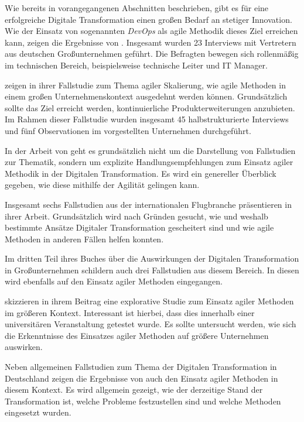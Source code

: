 Wie bereits in vorangegangenen Abschnitten beschrieben, gibt es für eine erfolgreiche Digitale Transformation einen großen Bedarf an stetiger Innovation. Wie der Einsatz von sogenannten \textit{DevOps} als agile Methodik dieses Ziel erreichen kann, zeigen die Ergebnisse von . Insgesamt wurden 23 Interviews mit Vertretern aus deutschen Großunternehmen geführt. Die Befragten bewegen sich rollenmäßig im technischen Bereich, beispielsweise technische Leiter und IT Manager.

 zeigen in ihrer Fallstudie zum Thema agiler Skalierung, wie agile Methoden in einem großen Unternehmenskontext ausgedehnt werden können. Grundsätzlich sollte das Ziel erreicht werden, kontinuierliche Produkterweiterungen anzubieten. Im Rahmen dieser Fallstudie wurden insgesamt 45 halbstrukturierte Interviews  und fünf Observationen im vorgestellten Unternehmen durchgeführt.

In der Arbeit von  geht es grundsätzlich nicht um die Darstellung von Fallstudien zur Thematik, sondern um explizite Handlungsempfehlungen zum Einsatz agiler Methodik in der Digitalen Transformation. Es wird ein genereller Überblick gegeben, wie diese mithilfe der Agilität gelingen kann.

Insgesamt sechs Fallstudien aus der internationalen Flugbranche präsentieren  in ihrer Arbeit. Grundsätzlich wird nach Gründen gesucht, wie und weshalb bestimmte Ansätze Digitaler Transformation gescheitert sind und wie agile Methoden in anderen Fällen helfen konnten.

Im dritten Teil ihres Buches über die Auswirkungen der Digitalen Transformation in Großunternehmen schildern  auch drei Fallstudien aus diesem Bereich. In diesen wird ebenfalls auf den Einsatz agiler Methoden eingegangen. 

 skizzieren in ihrem Beitrag eine explorative Studie zum Einsatz agiler Methoden im größeren Kontext. Interessant ist hierbei, dass dies innerhalb einer universitären Veranstaltung getestet wurde. Es sollte untersucht werden, wie sich die Erkenntnisse des Einsatzes agiler Methoden auf größere  Unternehmen auswirken.

Neben allgemeinen Fallstudien zum Thema der Digitalen Transformation in Deutschland zeigen die Ergebnisse von  auch den Einsatz agiler Methoden in diesem Kontext.  Es wird allgemein gezeigt, wie der derzeitige Stand der Transformation ist, welche Probleme festzustellen sind und welche Methoden eingesetzt wurden.

